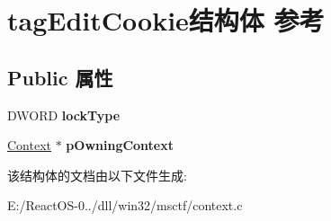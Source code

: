 \hypertarget{structtag_edit_cookie}{}\section{tag\+Edit\+Cookie结构体 参考}
\label{structtag_edit_cookie}
\subsection*{Public 属性}
\begin{DoxyCompactItemize}
\item 
\mbox{\label{structtag_edit_cookie_aad3bbb970b2ffc38d52d7c527182b162}} 
D\+W\+O\+RD {\bfseries lock\+Type}
\item 
\mbox{\label{structtag_edit_cookie_af42823d680973abe7ec1e167e67e99f6}} 
\hyperlink{struct_context}{Context} $\ast$ {\bfseries p\+Owning\+Context}
\end{DoxyCompactItemize}


该结构体的文档由以下文件生成\+:\begin{DoxyCompactItemize}
\item 
E\+:/\+React\+O\+S-\/0../dll/win32/msctf/context.\+c\end{DoxyCompactItemize}
